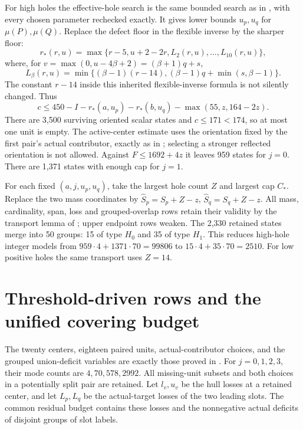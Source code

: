 \documentclass[11pt,a4paper]{article}
\begin{document}
For high holes the effective-hole search is the same bounded search as
in \cite{previous}, with every chosen parameter rechecked exactly.
It gives lower bounds $u_p,u_q$ for $\mu(P),\mu(Q)$. Replace the defect
floor in the flexible inverse by the sharper floor:
\[
 r_*(r,u)=\max\{r-5,u+2-2r,L_2(r,u),\ldots,L_{10}(r,u)\},
\]
where, for $v=\max(0,u-4\beta+2)=(\beta+1)q+s$,
\[
 L_\beta(r,u)=\min\{(\beta-1)(r-14),(\beta-1)q+\min(s,\beta-1)\}.
\]
The constant $r-14$ inside this inherited flexible-inverse formula is
not silently changed. Thus
\[
 c\le450-I-r_*(a,u_p)-r_*(b,u_q)-\max(55,z,164-2z).
\]
There are 3,500 surviving oriented scalar states and $c\le171<174$,
so at most one unit is empty. The active-center estimate uses the
orientation fixed by the first pair's actual contributor, exactly as
in \cite{previous}; selecting a stronger reflected orientation is not
allowed. Against $F\le1692+4z$ it leaves 959 states for $j=0$.
There are 1,371 states with enough cap for $j=1$.

For each fixed $(a,j,u_p,u_q)$, take the largest hole count $Z$ and
largest cap $C_*$. Replace the two mass coordinates by
$\widehat S_p=S_p+Z-z$, $\widehat S_q=S_q+Z-z$.
All mass, cardinality, span, loss and grouped-overlap rows retain their
validity by the transport lemma of \cite{previous}; upper endpoint rows
weaken. The 2,330 retained states merge into 50 groups: 15 of type
$H_0$ and 35 of type $H_1$. This reduces high-hole integer models from
$959\cdot4+1371\cdot70=99806$ to $15\cdot4+35\cdot70=2510$.
For low positive holes the same transport uses $Z=14$.

\section{Threshold-driven rows and the unified covering budget}
The twenty centers, eighteen paired units, actual-contributor choices,
and the grouped union-deficit variables are exactly those proved in
\cite{previous}. For $j=0,1,2,3$, their mode counts are
$4,70,578,2992$. All missing-unit subsets and both choices in a potentially
split pair are retained. Let $l_v,u_v$ be the hull losses at a retained
center, and let $L_p,L_q$ be the actual-target losses of the two leading
slots. The common residual budget contains these losses and the
nonnegative actual deficits of disjoint groups of slot labels.
\end{document}
